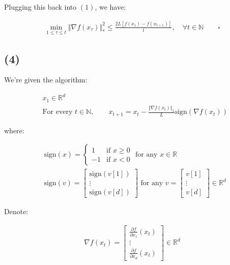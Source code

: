 \documentclass{article}
\begin{document}
Plugging this back into $(1)$, we have:

\begin{align*}
    \min_{1 \leq \tau \leq t} \Vert \nabla f ( x_\tau ) \Vert_*^2 \leq \frac{ 2 L \left[ f ( x_1 ) - f ( x_{t + 1} ) \right] }{t} , \quad \forall t \in \mathbb{N} \qquad \square
\end{align*}

\subsection*{(4)}

We're given the algorithm:

\begin{align*}
    &x_1 \in \mathbb{R}^d \\
    &\text{For every }t \in \mathbb{N}, \qquad x_{t+1} = x_t - \frac{\Vert \nabla f(x_t) \Vert_1}{L}\mathrm{sign}(\nabla f(x_t)) 
\end{align*}

where:

\begin{align*}
    &\mathrm{sign}(x) = 
    \begin{cases}
        1 & \text{if } x \geq 0 \\
        -1 & \text{if } x < 0 
    \end{cases} \text{ for any } x \in \mathbb{R} \\
    & \mathrm{sign}(v) = 
    \begin{bmatrix}
        \mathrm{sign}(v[1]) \\
        \vdots \\
        \mathrm{sign}(v[d])
    \end{bmatrix}
    \text{ for any } v = \begin{bmatrix} v[1] \\ \vdots \\ v[d] \end{bmatrix} \in \mathbb{R}^d
\end{align*}

Denote:

\begin{align*}
    \nabla f(x_t) = 
    \begin{bmatrix}
        \frac{\partial f}{\partial x_1}(x_t) \\
        \vdots \\
        \frac{\partial f}{\partial x_d}(x_t)
    \end{bmatrix}
    \in \mathbb{R}^d
\end{align*}
\end{document}
